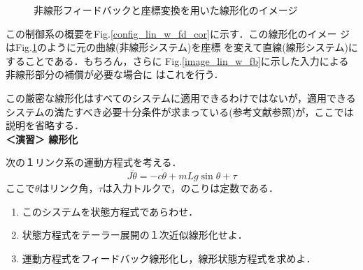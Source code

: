 \begin{figure}[htbp]
 \begin{center}
  \caption{非線形フィードバックと座標変換を用いた線形化のイメージ}
  \label{image_lin_w_fb_cor}
 \end{center}
\end{figure}

この制御系の概要をFig.\ref{config_lin_w_fd_cor}に示す．この線形化のイメー
ジはFig.\ref{image_lin_w_fb_cor}のように元の曲線(非線形システム)を座標
を変えて直線(線形システム)にすることである．もちろん，さらに
Fig.\ref{image_lin_w_fb}に示した入力による非線形部分の補償が必要な場合に
はこれを行う．

この厳密な線形化はすべてのシステムに適用できるわけではないが，適用できるシステムの満たすべき必要十分条件が求まっている(参考文献参照)が，ここでは説明を省略する．
\\


\noindent
{\bf ＜演習＞ 線形化}\nopagebreak

次の１リンク系の運動方程式を考える．
\[
	J \ddot{\theta} = -c \dot{\theta} + mLg \sin \theta + \tau
\]\nopagebreak
ここで$\theta$はリンク角，$\tau$は入力トルクで，のこりは定数である．

\begin{enumerate}
\item 
このシステムを状態方程式であらわせ．
\item
状態方程式をテーラー展開の１次近似線形化せよ．
\item
運動方程式をフィードバック線形化し，線形状態方程式を求めよ．
\end{enumerate}
